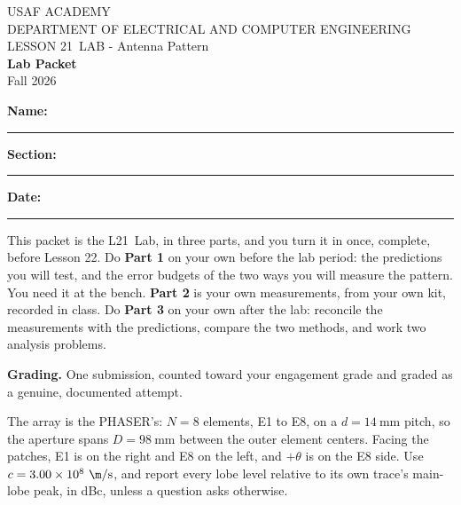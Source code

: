 \documentclass{exam}
\def\labLesson{21}
\def\thisterm{\thisTermIn}
\def\thisterm{Fall 2026}
\begin{document}
\pagestyle{headandfoot}   %



\begin{center}
USAF ACADEMY \\
DEPARTMENT OF ELECTRICAL AND COMPUTER ENGINEERING \\
LESSON \labLesson\ LAB - Antenna Pattern \\
\textbf{Lab Packet} \\
\thisterm \\[4mm]
\end{center}

\vspace{-4pt}
\textbf{Name:} \rule[-2pt]{2.6in}{0.4pt} \hfill
\textbf{Section:} \rule[-2pt]{0.9in}{0.4pt} \hfill
\textbf{Date:} \rule[-2pt]{1.1in}{0.4pt}

\vspace{4pt}


\vspace{2pt}

This packet is the L\labLesson\ Lab, in three parts, and you turn it in once,
complete, before Lesson 22. Do \textbf{Part 1} on your own before the lab
period: the predictions you will test, and the error budgets of the two ways you
will measure the pattern. You need it at the bench. \textbf{Part 2} is your own
measurements, from your own kit, recorded in class. Do \textbf{Part 3} on your
own after the lab: reconcile the measurements with the predictions, compare the
two methods, and work two analysis problems.

\textbf{Grading.} One submission, counted toward your engagement grade and
graded as a genuine, documented attempt.

The array is the PHASER's: $N = 8$ elements, E1 to E8, on a $d = 14\ \text{mm}$
pitch, so the aperture spans $D = 98\ \text{mm}$ between the outer element
centers. Facing the patches, E1 is on the right and E8 on the left, and
$+\theta$ is on the E8 side. Use $c = 3.00\times 10^{8}\ \m/\text{s}$, and report
every lobe level relative to its own trace's main-lobe peak, in dBc, unless a
question asks otherwise.
\end{document}
